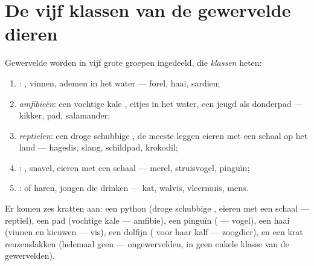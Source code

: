 \section{De vijf klassen van de gewervelde dieren}

\begin{proposition}\label{prop:g4:classifying-animals:classes}
Gewervelde  worden in vijf grote groepen ingedeeld, die
\emph{klassen} heten:
\begin{enumerate}
  \item \emph{}: , vinnen, ademen in het water --- forel,
        haai, sardien;
  \item \emph{amfibieën}: een vochtige kale , eitjes
        in het water, een jeugd als donderpad --- kikker, pad, salamander;
  \item \emph{reptielen}: een droge schubbige , de
        meeste leggen eieren met een schaal op het land --- hagedis,
        slang, schildpad, krokodil;
  \item \emph{}: , snavel, eieren met een schaal --- merel,
        struisvogel, pinguïn;
  \item \emph{}:  of haren, jongen die  drinken ---
        kat, walvis, vleermuis, mens.
\end{enumerate}
\end{proposition}
\admitted

\begin{example}\label{ex:g4:classifying-animals:zoo}
Er komen zes kratten aan: een python (droge schubbige , eieren met
een schaal --- reptiel), een pad (vochtige kale  --- amfibie), een
pinguïn ( --- vogel), een haai (vinnen en kieuwen --- vis), een
dolfijn ( voor haar kalf --- zoogdier), en een krat reuzenslakken
(helemaal geen  --- ongewervelden, in geen enkele klasse van
de gewervelden).
\end{example}

